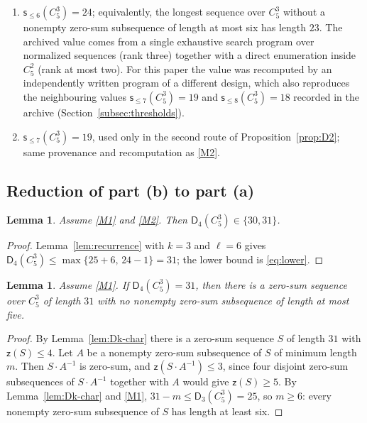 \documentclass[11pt]{article}
\newtheorem{lemma}[theorem]{Lemma}
\theoremstyle{definition}
\theoremstyle{remark}
\newcommand{\Dk}{\mathsf{D}}
\newcommand{\C}{C_5^{3}}
\newcommand{\zz}{\mathsf{z}}
\newcommand{\sle}[1]{\mathsf{s}_{\le #1}}
\begin{document}
\begin{enumerate}[label=\textup{(M\arabic*)},leftmargin=3em]
\item\label{M2} $\sle{6}(\C)=24$; equivalently, the longest sequence over $\C$ without a nonempty zero-sum subsequence of length at most six has length $23$. The archived value comes from a single exhaustive search program over normalized sequences (rank three) together with a direct enumeration inside $C_5^2$ (rank at most two). For this paper the value was recomputed by an independently written program of a different design, which also reproduces the neighbouring values $\sle{7}(\C)=19$ and $\sle{8}(\C)=18$ recorded in the archive (Section~\ref{subsec:thresholds}).
\item\label{M3} $\sle{7}(\C)=19$, used only in the second route of Proposition~\ref{prop:D2}; same provenance and recomputation as \ref{M2}.
\end{enumerate}

\subsection{Reduction of part (b) to part (a)}

\begin{lemma}\label{lem:corridor}
Assume \ref{M1} and \ref{M2}. Then $\Dk_4(\C)\in\{30,31\}$.
\end{lemma}

\begin{proof}
Lemma~\ref{lem:recurrence} with $k=3$ and $\ell=6$ gives $\Dk_4(\C)\le\max\{25+6,\,24-1\}=31$; the lower bound is \eqref{eq:lower}.
\end{proof}

\begin{lemma}\label{lem:reduction}
Assume \ref{M1}. If $\Dk_4(\C)=31$, then there is a zero-sum sequence over $\C$ of length $31$ with no nonempty zero-sum subsequence of length at most five.
\end{lemma}

\begin{proof}
By Lemma~\ref{lem:Dk-char} there is a zero-sum sequence $S$ of length $31$ with $\zz(S)\le4$. Let $A$ be a nonempty zero-sum subsequence of $S$ of minimum length $m$. Then $S\cdot A^{-1}$ is zero-sum, and $\zz(S\cdot A^{-1})\le3$, since four disjoint zero-sum subsequences of $S\cdot A^{-1}$ together with $A$ would give $\zz(S)\ge5$. By Lemma~\ref{lem:Dk-char} and \ref{M1}, $31-m\le\Dk_3(\C)=25$, so $m\ge6$: every nonempty zero-sum subsequence of $S$ has length at least six.
\end{proof}
\end{document}
